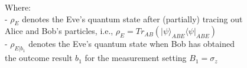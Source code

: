 \documentclass{beamer}
\begin{document}
\begin{frame}
\begin{itemize}
\begin{itemize}
\begin{itemize}
                        \vspace{1ex}
                        \footnotesize Where:\\
                        - ${\rho}_{E}$ denotes the Eve's quantum state after (partially) tracing out\\\hspace{0.5em}Alice and Bob's particles, i.e., ${\rho}_{E} = {Tr}_{AB}\left({|\psi\rangle}_{ABE}{\langle\psi|}_{ABE}\right)$\\
                        - ${\rho}_{E|{b}_{1}}$ denotes the Eve's quantum state when Bob has obtained\\\hspace{0.5em}the outcome result ${b}_{1}$ for the measurement setting ${B}_{1} = {\sigma}_{z}$
                     \end{itemize}
                \end{itemize}
            \end{itemize}
		\end{frame}
\end{document}
